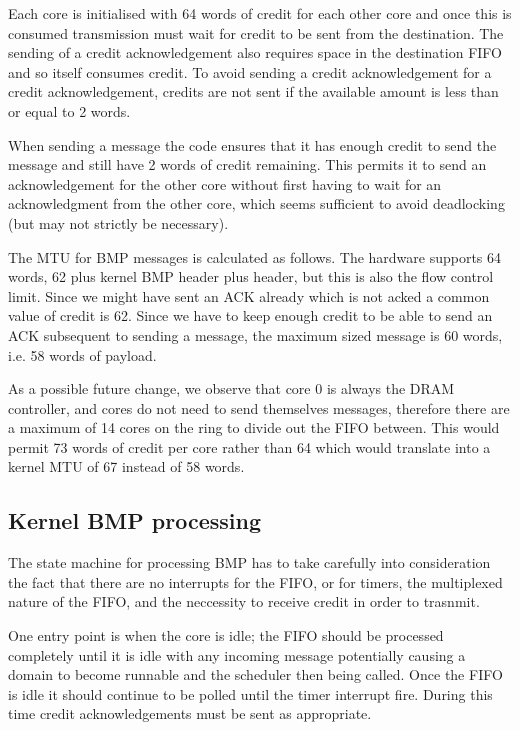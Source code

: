 \documentclass[a4paper,twoside]{report} %
\begin{document}
Each core is initialised with 64 words of credit for each other core
and once this is consumed transmission must wait for credit to be sent
from the destination.  The sending of a credit acknowledgement also
requires space in the destination FIFO and so itself consumes credit.
To avoid sending a credit acknowledgement for a credit
acknowledgement, credits are not sent if the available amount is less
than or equal to 2 words.

When sending a message the code ensures that it has enough credit to
send the message and still have 2 words of credit remaining.  This
permits it to send an acknowledgement for the other core without first
having to wait for an acknowledgment from the other core, which seems
sufficient to avoid deadlocking (but may not strictly be necessary).

The MTU for BMP messages is calculated as follows.  The hardware
supports 64 words, 62 plus kernel BMP header plus header, but this is
also the flow control limit.  Since we might have sent an ACK already
which is not acked a common value of credit is 62.  Since we have to
keep enough credit to be able to send an ACK subsequent to sending a
message, the maximum sized message is 60 words, i.e. 58 words of
payload.

As a possible future change, we observe that core 0 is always the DRAM
controller, and cores do not need to send themselves messages,
therefore there are a maximum of 14 cores on the ring to divide out
the FIFO between.  This would permit 73 words of credit per core
rather than 64 which would translate into a kernel MTU of 67 instead
of 58 words.

\subsection{Kernel BMP processing}

The state machine for processing BMP has to take carefully into
consideration the fact that there are no interrupts for the FIFO, or
for timers, the multiplexed nature of the FIFO, and the neccessity to
receive credit in order to trasnmit.

One entry point is when the core is idle; the FIFO should be processed
completely until it is idle with any incoming message potentially
causing a domain to become runnable and the scheduler then being
called.  Once the FIFO is idle it should continue to be polled until
the timer interrupt fire.  During this time credit acknowledgements
must be sent as appropriate.
\end{document}
